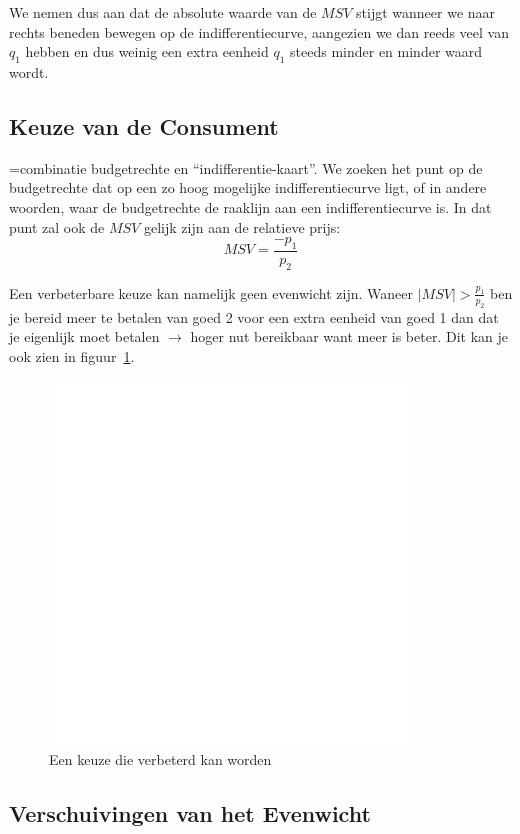 We nemen dus aan dat de absolute waarde van de $MSV$ stijgt wanneer we naar rechts beneden bewegen op de indifferentiecurve, aangezien we dan reeds veel van $q_1$ hebben en dus weinig een extra eenheid $q_1$ steeds minder en minder waard wordt.

\subsection{Keuze van de Consument}
=combinatie budgetrechte en ``indifferentie-kaart''. We zoeken het punt op de budgetrechte dat op een zo hoog mogelijke indifferentiecurve ligt, of in andere woorden, waar de budgetrechte de raaklijn aan een indifferentiecurve is. In dat punt zal ook de $MSV$ gelijk zijn aan de relatieve prijs:
\begin{equation}
	MSV = \frac{-p_1}{p_2}
\end{equation}

Een verbeterbare keuze kan namelijk geen evenwicht zijn. Waneer $|MSV| > \frac{p_1}{p_2}$ ben je bereid meer te betalen van goed 2 voor een extra eenheid van goed 1 dan dat je eigenlijk moet betalen $\rightarrow$ hoger nut bereikbaar want meer is beter. Dit kan je ook zien in figuur~\ref{fig:verbeterbareKeuze}.
\begin{figure}[htbp]
	\centering
	\includegraphics[scale=0.4]{Images/white.png}
	\caption{Een keuze die verbeterd kan worden}
	\label{fig:verbeterbareKeuze}
\end{figure}

\subsection{Verschuivingen van het Evenwicht}

